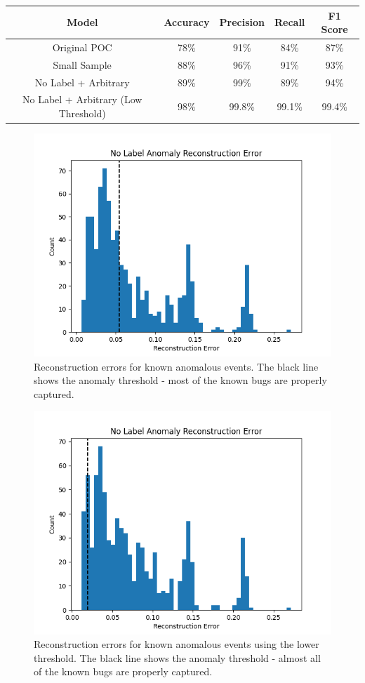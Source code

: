 \documentclass[a4paper,11pt]{article}
\begin{document}
\begin{center}
\begin{tabular}{ |c|c|c|c|c| } 
 \hline
 Model & Accuracy & Precision & Recall & F1 Score \\ \hline
 Original POC & 78\% & 91\% & 84\% & 87\% \\
 Small Sample & 88\% & 96\% & 91\% & 93\% \\
 No Label + Arbitrary & 89\% & 99\% & 89\% & 94\% \\
 No Label + Arbitrary (Low Threshold) & 98\% & 99.8\% & 99.1\% & 99.4\% \\
 \hline
\end{tabular}
\end{center}
\begin{figure}[H]
\centering
\includegraphics[width=.8\textwidth]{nolabel_anomaly_reconstruction.png}
\caption{Reconstruction errors for known anomalous events. The black line shows the anomaly threshold - most of the known bugs are properly captured.}
\label{nolabel_anomaly_reconstruction}
\end{figure}
\begin{figure}[H]
\centering
\includegraphics[width=.8\textwidth]{nolabel_anomaly_low.png}
\caption{Reconstruction errors for known anomalous events using the lower threshold. The black line shows the anomaly threshold - almost all of the known bugs are properly captured.}
\label{nolabel_anomaly_low}
\end{figure}
\newpage
\end{document}
